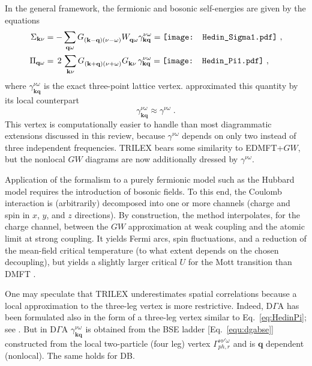 \documentclass[rmp,aps,reprint,amsmath,amssymb,superscriptaddress,showpacs,nofootinbib]{revtex4-1}
\newcommand{\kv}{\ensuremath{\mathbf{k}}}
\newcommand{\qv}{\ensuremath{\mathbf{q}}}
\begin{document}
In the general framework, the fermionic and bosonic self-energies are given by the  equations
\begin{align}
  \Sigma_{\kv\nu} &= -\sum\limits_{\qv\omega}G^{\phantom{\kv}}_{(\kv-\qv)(\nu-\omega)}W^{\phantom{\kv}}_{\qv\omega}\gamma_{\kv\qv}^{\nu\omega} =
  \texttt{[image: Hedin\_Sigma1.pdf]}~, \notag\\
\label{eq:HedinPi}
  \Pi_{\qv\omega} &= \,2\,\sum\limits_{\kv\nu}G^{\phantom{\kv}}_{(\kv+\qv)(\nu+\omega)}G^{\phantom{\kv}}_{\kv\nu}\,\gamma_{\kv\qv}^{\nu\omega}=
  \texttt{[image: Hedin\_Pi1.pdf]}~, 
\end{align}
where $\gamma_{\kv\qv}^{\nu\omega}$ is the exact three-point lattice vertex.  approximated  this quantity by its local counterpart
\begin{equation}
  \gamma_{\kv\qv}^{\nu\omega}\approx\gamma^{\nu\omega} \; .
\end{equation} 
This vertex is  computationally easier to handle than most diagrammatic extensions discussed in this review, because $\gamma^{\nu\omega}$ depends on only two instead of three independent frequencies. TRILEX bears some similarity to EDMFT+$GW$, but  the nonlocal $GW$ diagrams are now additionally dressed by $\gamma^{\nu\omega}$.

Application of the formalism to a purely fermionic model such as the Hubbard model requires the introduction of bosonic fields. To this end, the Coulomb interaction is (arbitrarily) decomposed into one or more channels (charge and spin in $x$, $y$, and $z$ directions). By construction, the method interpolates, for the charge channel, between the $GW$ approximation at weak coupling and the atomic limit at strong coupling. It yields  Fermi arcs,  spin fluctuations, and a reduction of the mean-field critical temperature (to what extent depends on the chosen decoupling),  but yields a slightly larger critical  $U$ for the Mott transition than DMFT \cite{Ayral2016}.

One may speculate that TRILEX underestimates spatial correlations because a local approximation to the three-leg vertex is more restrictive.
Indeed,  D$\Gamma$A has been formulated also in the form of a three-leg vertex similar to Eq.~\eqref{eq:HedinPi}; see . But in D$\Gamma$A  $\gamma_{\kv\qv}^{\nu\omega}$ is obtained from the BSE ladder [Eq.~\eqref{equ:dgabse}] constructed from the local two-particle (four leg) vertex  $\Gamma_{ph,r}^{\nu\nu'\omega}$ and is $\qv$ dependent (nonlocal). The same holds for DB.
\end{document}
